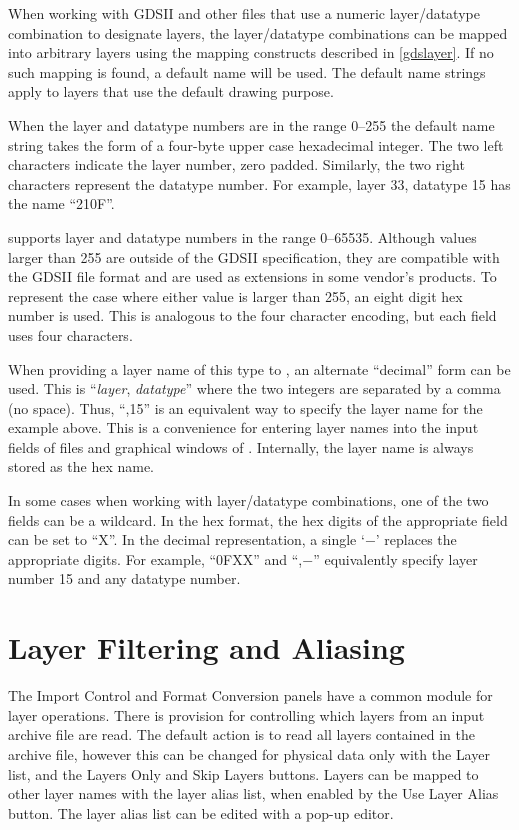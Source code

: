 When working with GDSII and other files that use a numeric
layer/datatype combination to designate layers, the layer/datatype
combinations can be mapped into arbitrary {\Xic} layers using the
mapping constructs described in \ref{gdslayer}.  If no such mapping is
found, a default name will be used.  The default name strings apply to
{\Xic} layers that use the default {\vt drawing} purpose.

When the layer and datatype numbers are in the range 0--255 the
default name string takes the form of a four-byte upper case
hexadecimal integer.  The two left characters indicate the layer
number, zero padded.  Similarly, the two right characters represent
the datatype number.  For example, layer 33, datatype 15 has the name
``{\vt 210F}''.

{\Xic} supports layer and datatype numbers in the range 0--65535. 
Although values larger than 255 are outside of the GDSII
specification, they are compatible with the GDSII file format and are
used as extensions in some vendor's products.  To represent the case
where either value is larger than 255, an eight digit hex number is
used.  This is analogous to the four character encoding, but each
field uses four characters.

When providing a layer name of this type to {\Xic}, an alternate
``decimal'' form can be used.  This is ``{\it layer\/},{\it
datatype\/}'' where the two integers are separated by a comma (no
space).  Thus, ``{,15}'' is an equivalent way to specify the
layer name for the example above.  This is a convenience for entering
layer names into the input fields of files and graphical windows of
{\Xic}.  Internally, the layer name is always stored as the hex name.

In some cases when working with layer/datatype combinations, one of
the two fields can be a wildcard.  In the hex format, the hex digits
of the appropriate field can be set to ``{\vt X}''.  In the decimal
representation, a single `$-$' replaces the appropriate digits.  For
example, ``{\vt 0FXX}'' and ``{,$-$}'' equivalently specify
layer number 15 and any datatype number.


\section{Layer Filtering and Aliasing}
\label{layerchange}
The {\cb Import Control} and {\cb Format Conversion} panels have a
common module for layer operations.  There is provision for
controlling which layers from an input archive file are read.  The
default action is to read all layers contained in the archive file,
however this can be changed for physical data only with the {\cb Layer
list}, and the {\cb Layers Only} and {\cb Skip Layers} buttons. 
Layers can be mapped to other layer names with the layer alias list,
when enabled by the {\cb Use Layer Alias} button.  The layer alias
list can be edited with a pop-up editor.

